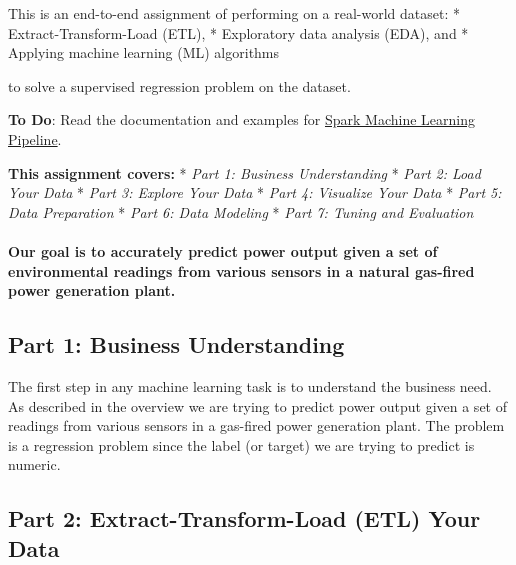 \documentclass[11pt]{article}
\begin{document}
This is an end-to-end assignment of performing on a real-world dataset:
* Extract-Transform-Load (ETL), * Exploratory data analysis (EDA), and *
Applying machine learning (ML) algorithms

to solve a supervised regression problem on the dataset.

\textbf{To Do}: Read the documentation and examples for
\href{https://spark.apache.org/docs/latest/ml-pipeline.html}{Spark
Machine Learning Pipeline}.

\textbf{This assignment covers:} * \emph{Part 1: Business Understanding}
* \emph{Part 2: Load Your Data} * \emph{Part 3: Explore Your Data} *
\emph{Part 4: Visualize Your Data} * \emph{Part 5: Data Preparation} *
\emph{Part 6: Data Modeling} * \emph{Part 7: Tuning and Evaluation}

\hypertarget{our-goal-is-to-accurately-predict-power-output-given-a-set-of-environmental-readings-from-various-sensors-in-a-natural-gas-fired-power-generation-plant.}{%
\paragraph{Our goal is to accurately predict power output given a set of
environmental readings from various sensors in a natural gas-fired power
generation
plant.}\label{our-goal-is-to-accurately-predict-power-output-given-a-set-of-environmental-readings-from-various-sensors-in-a-natural-gas-fired-power-generation-plant.}}

    \hypertarget{part-1-business-understanding}{%
\subsection{Part 1: Business
Understanding}\label{part-1-business-understanding}}

The first step in any machine learning task is to understand the
business need. As described in the overview we are trying to predict
power output given a set of readings from various sensors in a gas-fired
power generation plant. The problem is a regression problem since the
label (or target) we are trying to predict is numeric.

    \hypertarget{part-2-extract-transform-load-etl-your-data}{%
\subsection{Part 2: Extract-Transform-Load (ETL) Your
Data}\label{part-2-extract-transform-load-etl-your-data}}
\end{document}
